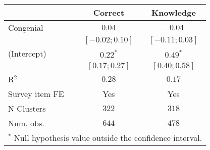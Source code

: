 \begin{table}
\begin{center}
\begin{tabular}{l c c}
\hline
 & Correct & Knowledge \\
\hline
Congenial      & $0.04$           & $-0.04$          \\
               & $ [-0.02; 0.10]$ & $ [-0.11; 0.03]$ \\
(Intercept)    & $0.22^{*}$       & $0.49^{*}$       \\
               & $ [ 0.17; 0.27]$ & $ [ 0.40; 0.58]$ \\
\hline
R$^2$          & $0.28$           & $0.17$           \\
Survey item FE & Yes              & Yes              \\
N Clusters     & $322$            & $318$            \\
Num. obs.      & $644$            & $478$            \\
\hline
\multicolumn{3}{l}{\scriptsize{$^*$ Null hypothesis value outside the confidence interval.}}
\end{tabular}
\end{center}
\end{table}